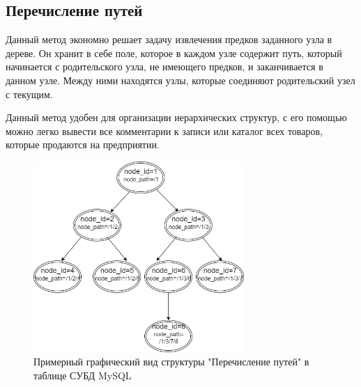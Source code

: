 \documentclass[a4paper,14pt]{extreport}
\theoremstyle{definition}
\begin{document}
\begin{table}[H]
\end{table}
\subsection{Перечисление путей}
Данный метод экономно решает задачу извлечения предков заданного узла в дереве. Он хранит в себе поле, которое в каждом узле содержит путь, который начинается с родительского узла, не имеющего предков, и заканчивается в данном узле. Между ними находятся узлы, которые соединяют родительский узел с текущим.

Данный метод удобен для организации иерархических структур, с его помощью можно легко вывести все комментарии к записи или каталог всех товаров, которые продаются на предприятии.
\begin{figure}[h!]
\begin{center}
\includegraphics[width=8cm]{12.png}
\caption{Примерный графический вид структуры "Перечисление путей" в таблице СУБД MySQL}
\label{fig:3}
\end{center}
\end{figure}
\end{document}
